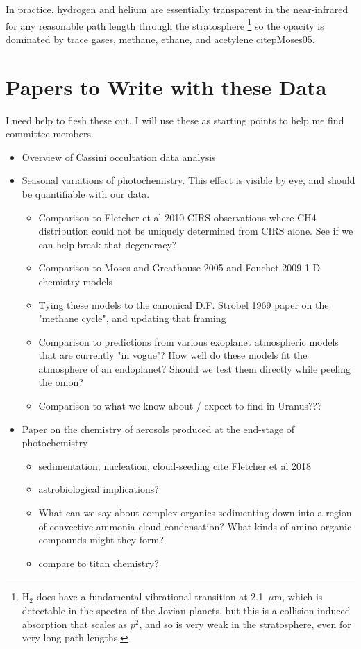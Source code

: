 \documentclass[12pt]{article}
\begin{document}
In practice, hydrogen and helium are essentially transparent in the
near-infrared for any reasonable path length through the stratosphere
\footnote{H$_2$ does have a fundamental vibrational transition at 2.1~$\mu$m,
which is detectable in the spectra of the Jovian planets, but this is a
collision-induced absorption that scales as  $p^2$, and so is very weak in the
stratosphere, even for very long path lengths.}  so the opacity is dominated by
trace gases, methane, ethane, and acetylene citep{Moses05}.

\section{Papers to Write with these Data}

I need help to flesh these out. I will use these as starting points to help me
find committee members.

\begin{itemize}
  \item Overview of Cassini occultation data analysis
  \item Seasonal variations of photochemistry. This effect is visible by eye, and should be quantifiable with our data.
  \begin{itemize}
     \item Comparison to Fletcher et al 2010 CIRS observations where CH4 distribution could not be uniquely determined from CIRS alone. See if we can help break that degeneracy?
     \item Comparison to Moses and Greathouse 2005 and Fouchet 2009 1-D chemistry models
     \item Tying these models to the canonical D.F. Strobel 1969 paper on the
      "methane cycle", and updating that framing
     \item Comparison to predictions from various exoplanet atmospheric models that
      are currently "in vogue"? How well do these models fit the atmosphere of
      an endoplanet? Should we test them directly while peeling the onion?
     \item Comparison to what we know about / expect to find in Uranus???
  \end{itemize}
  \item Paper on the chemistry of aerosols produced at the end-stage of photochemistry
  \begin{itemize}
     \item sedimentation, nucleation, cloud-seeding cite Fletcher et al 2018
     \item astrobiological implications?
     \item What can we say about complex organics sedimenting down into a region of
      convective ammonia cloud condensation? What kinds of amino-organic
      compounds might they form?
     \item compare to titan chemistry?
  \end{itemize}
\end{itemize}
\end{document}
